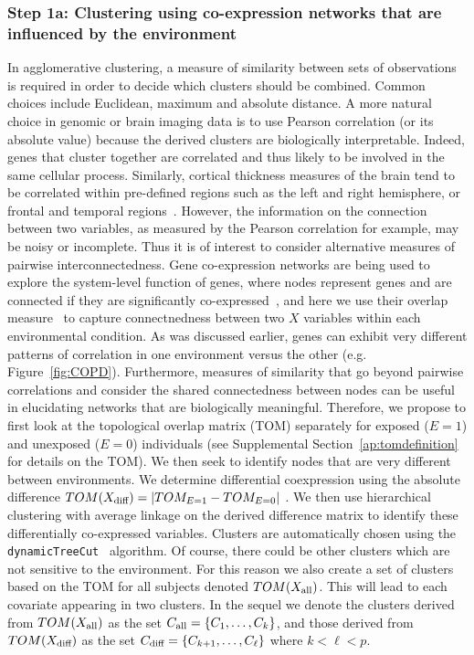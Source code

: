 \subsubsection{Step 1a: Clustering using co-expression networks that are influenced by the environment}
In agglomerative clustering, a measure of similarity between sets of observations is required in order to decide which clusters should be combined. Common choices include Euclidean, maximum and absolute distance. A more natural choice in genomic or brain imaging data is to use Pearson correlation (or its absolute value) because the derived clusters are biologically interpretable. Indeed, genes that cluster together are correlated and thus likely to be involved in the same cellular process. Similarly, cortical thickness measures of the brain tend to be correlated within pre-defined regions such as the left and right hemisphere, or frontal and temporal regions~\citep{sato2013inter}. However, the information on the connection between two variables, as measured by the Pearson correlation for example, may be noisy or incomplete. Thus it is of interest to consider alternative measures of pairwise interconnectedness. Gene co-expression networks are being used to explore the system-level function of genes, where nodes represent genes and are connected if they are significantly co-expressed~\citep{zhang2005general}, and here we use their overlap measure~\citep{ravasz2002hierarchical} to capture connectnedness between two $X$ variables within each environmental condition. As was discussed earlier, genes can exhibit very different patterns of correlation in one environment versus the other (e.g. Figure~\ref{fig:COPD}). Furthermore, measures of similarity that go beyond pairwise correlations and consider the shared connectedness between nodes can be useful in elucidating networks that are biologically meaningful. Therefore, we propose to first look at the topological overlap matrix (TOM) separately for exposed ($E=1$) and unexposed ($E=0$) individuals (see Supplemental Section~\ref{ap:tomdefinition} for details on the TOM). We then seek to identify nodes that are very different between environments. We determine differential coexpression using the absolute difference $TOM(X_{\textrm{{diff}}}) = |TOM_{E=1} - TOM_{E=0}|$ \citep{klein2016gene}. We then use hierarchical clustering with average linkage on the derived difference matrix to identify these differentially co-expressed variables. Clusters are automatically chosen using the \texttt{dynamicTreeCut}~\citep{langfelder2008defining} algorithm. Of course, there could be other clusters which are not sensitive to the environment. For this reason we also create a set of clusters based on the TOM for all subjects denoted $TOM(X_{\textrm{{all}}})$. This will lead to each covariate appearing in two clusters. In the sequel we denote the clusters derived from $TOM(X_{\textrm{{all}}})$ as the set \mbox{$C_{\textrm{{all}}} = \left\lbrace C_1, \ldots, C_k\right\rbrace$}, and those derived from $TOM(X_{\textrm{{diff}}})$ as the set $C_{\textrm{{diff}}} = \left\lbrace C_{k+1}, \ldots, C_{\ell}\right\rbrace$ where $k < \ell < p$.  

